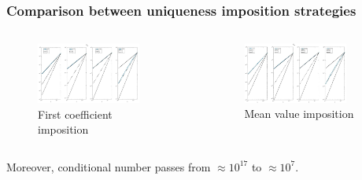 \documentclass[9pt]{beamer}
\begin{document}
\begin{frame}
	\frametitle{Comparison between uniqueness imposition strategies}
	\begin{columns}
		\begin{column}{0.5\textwidth}
			\begin{figure}[h]
				\includegraphics[width=0.8\textwidth]{D1_Vm_1.jpg} \caption{First coefficient imposition}
			\end{figure}
		\end{column}
		\begin{column}{0.5\textwidth}
			\begin{figure}[h]
				\includegraphics[width=0.8\textwidth]{D1_Vm_2.jpg} \caption{Mean value imposition}
			\end{figure}
		\end{column}
	\end{columns}
	\vspace{3mm}
	\begin{center}
	Moreover, conditional number passes from $\approx 10^{17}$ to $\approx 10^7$.
	\end{center}
\end{frame}
\end{document}
